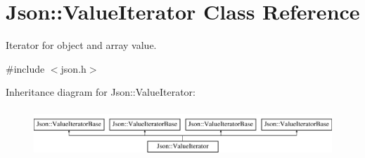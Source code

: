 \section{Json\+:\+:Value\+Iterator Class Reference}
\label{class_json_1_1_value_iterator}


Iterator for object and array value.  




{\ttfamily \#include $<$json.\+h$>$}

Inheritance diagram for Json\+:\+:Value\+Iterator\+:\begin{figure}[H]
\begin{center}
\leavevmode
\includegraphics[height=1.818182cm]{class_json_1_1_value_iterator}
\end{center}
\end{figure}
